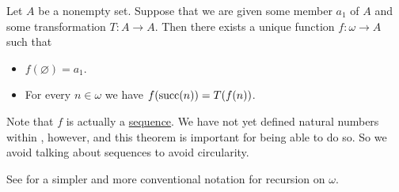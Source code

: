 \begin{theorem}\label{thm:omega_recursion}
  Let \( A \) be a nonempty set. Suppose that we are given some member \( a_1 \) of \( A \) and some transformation \( T: A \to A \). Then there exists a unique function \( f: \omega \to A \) such that
  \begin{itemize}
    \item \( f(\varnothing) = a_1 \).
    \item For every \( n \in \omega \) we have \( f(\operatorname{succ}(n)) = T(f(n)) \).
  \end{itemize}

  Note that \( f \) is actually a \hyperref[def:sequence]{sequence}. We have not yet defined natural numbers within , however, and this theorem is important for being able to do so. So we avoid talking about sequences to avoid circularity.

  See  for a simpler and more conventional notation for recursion on \( \omega \).
\end{theorem}
